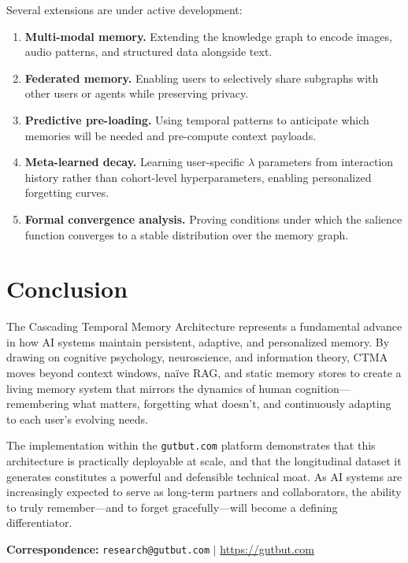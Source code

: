 \documentclass[11pt,a4paper]{article}
\begin{document}
Several extensions are under active development:

\begin{enumerate}[label=(\arabic*)]
  \item \textbf{Multi-modal memory.} Extending the knowledge graph to encode images, audio patterns, and structured data alongside text.
  \item \textbf{Federated memory.} Enabling users to selectively share subgraphs with other users or agents while preserving privacy.
  \item \textbf{Predictive pre-loading.} Using temporal patterns to anticipate which memories will be needed and pre-compute context payloads.
  \item \textbf{Meta-learned decay.} Learning user-specific $\lambda$ parameters from interaction history rather than cohort-level hyperparameters, enabling personalized forgetting curves.
  \item \textbf{Formal convergence analysis.} Proving conditions under which the salience function converges to a stable distribution over the memory graph.
\end{enumerate}


\section{Conclusion}
\label{sec:conclusion}

The Cascading Temporal Memory Architecture represents a fundamental advance in how AI systems maintain persistent, adaptive, and personalized memory. By drawing on cognitive psychology, neuroscience, and information theory, CTMA moves beyond context windows, na\"ive RAG, and static memory stores to create a living memory system that mirrors the dynamics of human cognition---remembering what matters, forgetting what doesn't, and continuously adapting to each user's evolving needs.

The implementation within the \texttt{gutbut.com} platform demonstrates that this architecture is practically deployable at scale, and that the longitudinal dataset it generates constitutes a powerful and defensible technical moat. As AI systems are increasingly expected to serve as long-term partners and collaborators, the ability to truly remember---and to forget gracefully---will become a defining differentiator.

\vspace{12pt}
\noindent\textbf{Correspondence:} \texttt{research@gutbut.com} \quad $|$ \quad \url{https://gutbut.com}
\end{document}

